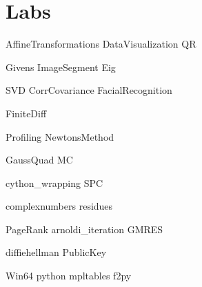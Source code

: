 \documentclass[nociteref]{SIAM-GH-book}
\begin{document}
\part{Labs}
{AffineTransformations}
{DataVisualization}
{QR}


{Givens}
{ImageSegment}
{Eig}


{SVD}
{CorrCovariance}
{FacialRecognition}

{FiniteDiff}

{Profiling}
{NewtonsMethod}


{GaussQuad}
{MC}

{cython_wrapping}
{SPC}

{complexnumbers}
{residues}

{PageRank}
{arnoldi_iteration}
{GMRES}

{diffiehellman}
{PublicKey}


\begin{appendices}
{Win64}
{python}
{mpltables}
{f2py}
\end{appendices}
\end{document}
